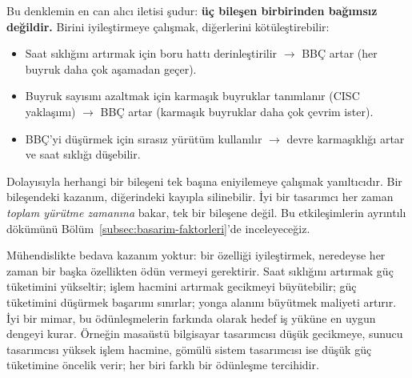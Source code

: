 Bu denklemin en can alıcı iletisi şudur: \textbf{üç bileşen birbirinden bağımsız değildir.} Birini iyileştirmeye çalışmak, diğerlerini kötüleştirebilir:
\begin{itemize}
    \item Saat sıklığını artırmak için boru hattı derinleştirilir $\rightarrow$ BBÇ artar (her buyruk daha çok aşamadan geçer).
    \item Buyruk sayısını azaltmak için karmaşık buyruklar tanımlanır (CISC yaklaşımı) $\rightarrow$ BBÇ artar (karmaşık buyruklar daha çok çevrim ister).
    \item BBÇ'yi düşürmek için sırasız yürütüm kullanılır $\rightarrow$ devre karmaşıklığı artar ve saat sıklığı düşebilir.
\end{itemize}

Dolayısıyla herhangi bir bileşeni tek başına eniyilemeye çalışmak yanıltıcıdır. Bir bileşendeki kazanım, diğerindeki kayıpla silinebilir. İyi bir tasarımcı her zaman \emph{toplam yürütme zamanına} bakar, tek bir bileşene değil. Bu etkileşimlerin ayrıntılı dökümünü Bölüm~\ref{subsec:basarim-faktorleri}'de inceleyeceğiz.

\begin{tanim}
Mühendislikte bedava kazanım yoktur: bir özelliği iyileştirmek, neredeyse her zaman bir başka özellikten ödün vermeyi gerektirir. Saat sıklığını artırmak güç tüketimini yükseltir; işlem hacmini artırmak gecikmeyi büyütebilir; güç tüketimini düşürmek başarımı sınırlar; yonga alanını büyütmek maliyeti artırır. İyi bir mimar, bu ödünleşmelerin farkında olarak hedef iş yüküne en uygun dengeyi kurar. Örneğin masaüstü bilgisayar tasarımcısı düşük gecikmeye, sunucu tasarımcısı yüksek işlem hacmine, gömülü sistem tasarımcısı ise düşük güç tüketimine öncelik verir; her biri farklı bir ödünleşme tercihidir.
\end{tanim}

